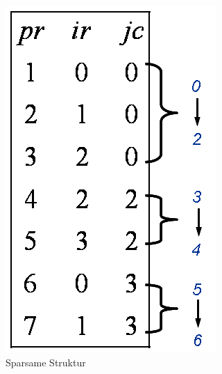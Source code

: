 \begin{figure}[htbp]
\begin{center}
\begin{minipage}[t]{0.4\linewidth}
			\includegraphics[width=\linewidth]{../xby/pic/numerische_sparse1}
			\caption{Sparsame Struktur}
			\label{numerische_sparse1}
		\end{minipage}
		\qquad
		\begin{minipage}[t]{0.4\linewidth}
			\centering

\end{minipage}
\end{center}
\end{figure}
